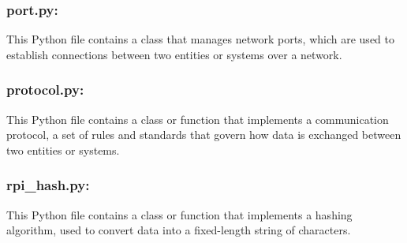 \documentclass{article}
\begin{document}
\subsubsection{port.py:} This Python file contains a class that manages network ports, which are used to establish connections between two entities or systems over a network.

\subsubsection{protocol.py:} This Python file contains a class or function that implements a communication protocol, a set of rules and standards that govern how data is exchanged between two entities or systems.

\subsubsection{rpi\_hash.py:} This Python file contains a class or function that implements a hashing algorithm, used to convert data into a fixed-length string of characters.
\end{document}
